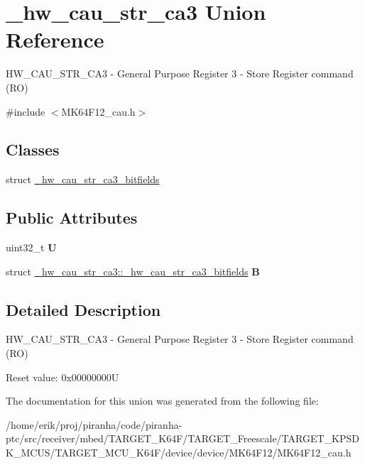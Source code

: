 \hypertarget{union__hw__cau__str__ca3}{}\section{\+\_\+hw\+\_\+cau\+\_\+str\+\_\+ca3 Union Reference}
\label{union__hw__cau__str__ca3}


H\+W\+\_\+\+C\+A\+U\+\_\+\+S\+T\+R\+\_\+\+C\+A3 -\/ General Purpose Register 3 -\/ Store Register command (RO)  




{\ttfamily \#include $<$M\+K64\+F12\+\_\+cau.\+h$>$}

\subsection*{Classes}
\begin{DoxyCompactItemize}
\item 
struct \hyperlink{struct__hw__cau__str__ca3_1_1__hw__cau__str__ca3__bitfields}{\+\_\+hw\+\_\+cau\+\_\+str\+\_\+ca3\+\_\+bitfields}
\end{DoxyCompactItemize}
\subsection*{Public Attributes}
\begin{DoxyCompactItemize}
\item 
uint32\+\_\+t {\bfseries U}\hypertarget{union__hw__cau__str__ca3_acc7a23d780e586d9177a02c9dadeb4fb}{}\label{union__hw__cau__str__ca3_acc7a23d780e586d9177a02c9dadeb4fb}

\item 
struct \hyperlink{struct__hw__cau__str__ca3_1_1__hw__cau__str__ca3__bitfields}{\+\_\+hw\+\_\+cau\+\_\+str\+\_\+ca3\+::\+\_\+hw\+\_\+cau\+\_\+str\+\_\+ca3\+\_\+bitfields} {\bfseries B}\hypertarget{union__hw__cau__str__ca3_a4b3a685ec3daf49663810696013023cb}{}\label{union__hw__cau__str__ca3_a4b3a685ec3daf49663810696013023cb}

\end{DoxyCompactItemize}


\subsection{Detailed Description}
H\+W\+\_\+\+C\+A\+U\+\_\+\+S\+T\+R\+\_\+\+C\+A3 -\/ General Purpose Register 3 -\/ Store Register command (RO) 

Reset value\+: 0x00000000U 

The documentation for this union was generated from the following file\+:\begin{DoxyCompactItemize}
\item 
/home/erik/proj/piranha/code/piranha-\/ptc/src/receiver/mbed/\+T\+A\+R\+G\+E\+T\+\_\+\+K64\+F/\+T\+A\+R\+G\+E\+T\+\_\+\+Freescale/\+T\+A\+R\+G\+E\+T\+\_\+\+K\+P\+S\+D\+K\+\_\+\+M\+C\+U\+S/\+T\+A\+R\+G\+E\+T\+\_\+\+M\+C\+U\+\_\+\+K64\+F/device/device/\+M\+K64\+F12/M\+K64\+F12\+\_\+cau.\+h\end{DoxyCompactItemize}
